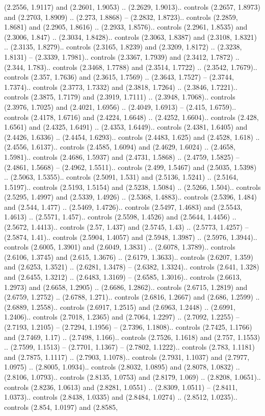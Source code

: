 (2.2556, 1.9117) and (2.2601, 1.9053) .. (2.2629, 1.9013).. controls (2.2657, 1.8973) and (2.2703, 1.8909) .. (2.273, 1.8868) -- (2.2832, 1.8723).. controls (2.2859, 1.8681) and (2.2905, 1.8616) .. (2.2933, 1.8576).. controls (2.2961, 1.8535) and (2.3006, 1.847) .. (2.3034, 1.8428).. controls (2.3063, 1.8387) and (2.3108, 1.8321) .. (2.3135, 1.8279).. controls (2.3165, 1.8239) and (2.3209, 1.8172) .. (2.3238, 1.8131) -- (2.3339, 1.7981).. controls (2.3367, 1.7939) and (2.3412, 1.7872) .. (2.344, 1.783).. controls (2.3468, 1.7788) and (2.3514, 1.7722) .. (2.3542, 1.7679).. controls (2.357, 1.7636) and (2.3615, 1.7569) .. (2.3643, 1.7527) -- (2.3744, 1.7374).. controls (2.3773, 1.7332) and (2.3818, 1.7264) .. (2.3846, 1.7221).. controls (2.3875, 1.7179) and (2.3919, 1.7111) .. (2.3948, 1.7068).. controls (2.3976, 1.7025) and (2.4021, 1.6956) .. (2.4049, 1.6913) -- (2.415, 1.6759).. controls (2.4178, 1.6716) and (2.4224, 1.6648) .. (2.4252, 1.6604).. controls (2.428, 1.6561) and (2.4325, 1.6491) .. (2.4353, 1.6449).. controls (2.4381, 1.6405) and (2.4426, 1.6336) .. (2.4454, 1.6293).. controls (2.4483, 1.625) and (2.4528, 1.618) .. (2.4556, 1.6137).. controls (2.4585, 1.6094) and (2.4629, 1.6024) .. (2.4658, 1.5981).. controls (2.4686, 1.5937) and (2.4731, 1.5868) .. (2.4759, 1.5825) -- (2.4861, 1.5668) -- (2.4962, 1.5511).. controls (2.499, 1.5467) and (2.5035, 1.5398) .. (2.5063, 1.5355).. controls (2.5091, 1.531) and (2.5136, 1.5241) .. (2.5164, 1.5197).. controls (2.5193, 1.5154) and (2.5238, 1.5084) .. (2.5266, 1.504).. controls (2.5295, 1.4997) and (2.5339, 1.4926) .. (2.5368, 1.4883).. controls (2.5396, 1.484) and (2.544, 1.477) .. (2.5469, 1.4726).. controls (2.5497, 1.4683) and (2.5543, 1.4613) .. (2.5571, 1.457).. controls (2.5598, 1.4526) and (2.5644, 1.4456) .. (2.5672, 1.4413).. controls (2.57, 1.437) and (2.5745, 1.43) .. (2.5773, 1.4257) -- (2.5874, 1.41).. controls (2.5904, 1.4057) and (2.5948, 1.3987) .. (2.5976, 1.3944).. controls (2.6005, 1.3901) and (2.6049, 1.3831) .. (2.6078, 1.3789).. controls (2.6106, 1.3745) and (2.615, 1.3676) .. (2.6179, 1.3633).. controls (2.6207, 1.359) and (2.6253, 1.3521) .. (2.6281, 1.3478) -- (2.6382, 1.3324).. controls (2.641, 1.328) and (2.6455, 1.3212) .. (2.6483, 1.3169) -- (2.6585, 1.3016).. controls (2.6613, 1.2973) and (2.6658, 1.2905) .. (2.6686, 1.2862).. controls (2.6715, 1.2819) and (2.6759, 1.2752) .. (2.6788, 1.271).. controls (2.6816, 1.2667) and (2.686, 1.2599) .. (2.6889, 1.2558).. controls (2.6917, 1.2515) and (2.6963, 1.2448) .. (2.6991, 1.2406).. controls (2.7018, 1.2365) and (2.7064, 1.2297) .. (2.7092, 1.2255) -- (2.7193, 1.2105) -- (2.7294, 1.1956) -- (2.7396, 1.1808).. controls (2.7425, 1.1766) and (2.7469, 1.17) .. (2.7498, 1.166).. controls (2.7526, 1.1618) and (2.757, 1.1553) .. (2.7599, 1.1513) -- (2.7701, 1.1367) -- (2.7802, 1.1222).. controls (2.783, 1.1181) and (2.7875, 1.1117) .. (2.7903, 1.1078).. controls (2.7931, 1.1037) and (2.7977, 1.0975) .. (2.8005, 1.0934).. controls (2.8032, 1.0895) and (2.8078, 1.0832) .. (2.8106, 1.0793).. controls (2.8135, 1.0753) and (2.8179, 1.069) .. (2.8208, 1.0651).. controls (2.8236, 1.0613) and (2.8281, 1.0551) .. (2.8309, 1.0511) -- (2.8411, 1.0373).. controls (2.8438, 1.0335) and (2.8484, 1.0274) .. (2.8512, 1.0235).. controls (2.854, 1.0197) and (2.8585, 